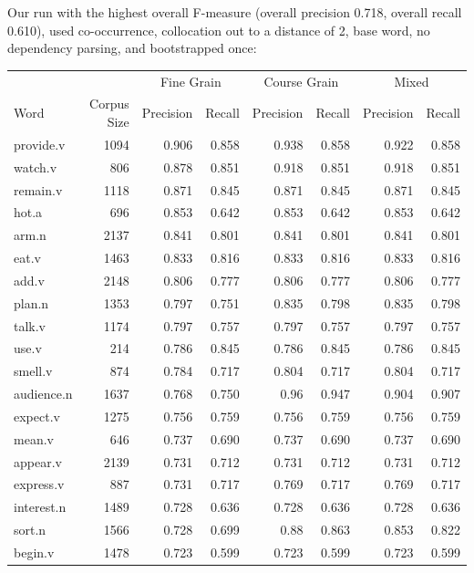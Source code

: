 \documentclass{article}
\begin{document}
Our run with the highest overall F-measure (overall precision 0.718, overall
recall 0.610), used co-occurrence, collocation out to a distance of 2, base word,
no dependency parsing, and bootstrapped once:

\begin{longtable}{l | r r r r r r r}
		&	&	\multicolumn{2}{c}{Fine Grain}	&	\multicolumn{2}{c}{Course Grain}	&	\multicolumn{2}{c}{Mixed}\\
Word	&	Corpus Size	&	Precision	&	Recall	&	Precision	&	Recall	&	Precision	&	Recall\\
\hline
provide.v   	&	1094	&	0.906	&	0.858	&	0.938	&	0.858	&	0.922	&	0.858\\
watch.v     	&	806 	&	0.878	&	0.851	&	0.918	&	0.851	&	0.918	&	0.851\\
remain.v    	&	1118	&	0.871	&	0.845	&	0.871	&	0.845	&	0.871	&	0.845\\
hot.a       	&	696 	&	0.853	&	0.642	&	0.853	&	0.642	&	0.853	&	0.642\\
arm.n       	&	2137	&	0.841	&	0.801	&	0.841	&	0.801	&	0.841	&	0.801\\
eat.v       	&	1463	&	0.833	&	0.816	&	0.833	&	0.816	&	0.833	&	0.816\\
add.v       	&	2148	&	0.806	&	0.777	&	0.806	&	0.777	&	0.806	&	0.777\\
plan.n      	&	1353	&	0.797	&	0.751	&	0.835	&	0.798	&	0.835	&	0.798\\
talk.v      	&	1174	&	0.797	&	0.757	&	0.797	&	0.757	&	0.797	&	0.757\\
use.v       	&	214 	&	0.786	&	0.845	&	0.786	&	0.845	&	0.786	&	0.845\\
smell.v     	&	874 	&	0.784	&	0.717   &	0.804	&	0.717   &	0.804	&	0.717\\
audience.n    	&	1637	&	0.768	&	0.750	&	0.96	&	0.947	&	0.904	&	0.907\\
expect.v    	&	1275	&	0.756	&	0.759	&	0.756	&	0.759	&	0.756	&	0.759\\
mean.v      	&	646 	&	0.737	&	0.690	&	0.737	&	0.690	&	0.737	&	0.690\\
appear.v    	&	2139	&	0.731	&	0.712	&	0.731	&	0.712	&	0.731	&	0.712\\
express.v    	&	887 	&	0.731	&	0.717   &	0.769	&	0.717   &	0.769	&	0.717\\
interest.n    	&	1489	&	0.728	&	0.636	&	0.728	&	0.636	&	0.728	&	0.636\\
sort.n      	&	1566	&	0.728	&	0.699	&	0.88	&	0.863	&	0.853	&	0.822\\
begin.v     	&	1478	&	0.723	&	0.599	&	0.723	&	0.599	&	0.723	&	0.599\\

\end{longtable}
\end{document}
